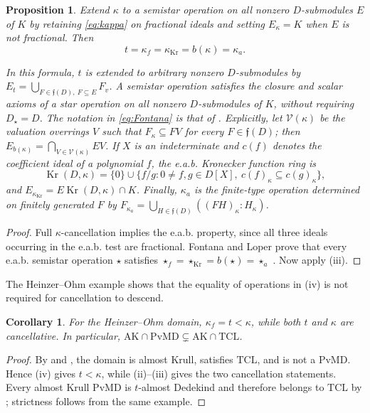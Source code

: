 \documentclass[11pt]{amsart}
\newtheorem{proposition}[proposition]{Proposition}
\newtheorem{corollary}[corollary]{Corollary}
\theoremstyle{definition}
\theoremstyle{remark}
\newcommand{\fcal}{\mathfrak f}
\newcommand{\PvMD}{\mathrm{PvMD}}
\newcommand{\TCL}{\mathrm{TCL}}
\newcommand{\AK}{\mathrm{AK}}
\newcommand{\Kr}{\operatorname{Kr}}
\begin{document}
\begin{proposition}\label{prop:Fontana}
Extend $\kappa$ to a semistar operation on all nonzero $D$-submodules
$E$ of $K$ by retaining \eqref{eq:kappa} on fractional ideals and setting
$E_\kappa=K$ when $E$ is not fractional.  Then
\begin{equation}\label{eq:Fontana}
 t=\kappa_f=\kappa_{\Kr}=b(\kappa)=\kappa_a.
\end{equation}

In this formula, $t$ is extended to arbitrary nonzero $D$-submodules by
$E_t=\bigcup_{F\in\fcal(D),\ F\subseteq E}F_v$.
A semistar operation satisfies the closure and scalar axioms of a star
operation on all nonzero $D$-submodules of $K$, without requiring
$D_\star=D$.  The notation in \eqref{eq:Fontana} is that of
\cite{FontanaLoper}.  Explicitly, let $\mathcal V(\kappa)$ be the
valuation overrings $V$ such that $F_\kappa\subseteq FV$ for every
$F\in\fcal(D)$; then $E_{b(\kappa)}=\bigcap_{V\in\mathcal V(\kappa)}EV$.
If $X$ is an indeterminate and $c(f)$ denotes the coefficient ideal of a
polynomial $f$, the e.a.b. Kronecker function ring is
\[
 \Kr(D,\kappa)=\{0\}\cup
 \{f/g:0\ne f,g\in D[X],\ c(f)_\kappa\subseteq c(g)_\kappa\},
\]
and $E_{\kappa_{\Kr}}=E\Kr(D,\kappa)\cap K$.
Finally, $\kappa_a$ is the finite-type operation determined on finitely
generated $F$ by
$F_{\kappa_a}=\bigcup_{H\in\fcal(D)}((FH)_\kappa:H_\kappa)$.
\end{proposition}

\begin{proof}
Full $\kappa$-cancellation implies the e.a.b. property, since all three
ideals occurring in the e.a.b. test are fractional.  Fontana and Loper prove
that every e.a.b. semistar operation $\star$ satisfies
$\star_f=\star_{\Kr}=b(\star)=\star_a$
\cite[Proposition~9]{FontanaLoper}.  Now apply
(iii).
\end{proof}

The Heinzer--Ohm example shows that the equality of operations in
(iv) is not required for cancellation to descend.

\begin{corollary}\label{cor:strict-descent}
For the Heinzer--Ohm domain, $\kappa_f=t<\kappa$, while both $t$ and
$\kappa$ are cancellative.  In particular,
$\AK\cap\PvMD\subsetneq\AK\cap\TCL$.
\end{corollary}

\begin{proof}
By  and , the domain is almost Krull, satisfies $\TCL$,
and is not a $\PvMD$.  Hence (iv) gives $t<\kappa$, while
(ii)--(iii) gives the two cancellation statements.  Every
almost Krull $\PvMD$ is $t$-almost Dedekind and therefore belongs to $\TCL$
by ; strictness follows from the same example.
\end{proof}
\end{document}
